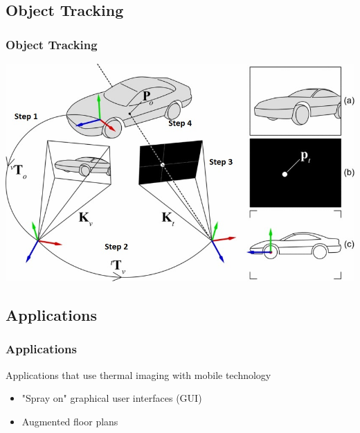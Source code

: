 \documentclass{beamer}
\begin{document}
\subsection{Object Tracking}
\begin{frame}	
\frametitle{Object Tracking}
	\includegraphics[width=\textwidth]{images/Tracking}
\end{frame}



\subsection{Applications}

\begin{frame}
	\frametitle{Applications}
	Applications that use thermal imaging with mobile technology 
	\begin{itemize}
		\item "Spray on" graphical user interfaces (GUI)
		\item Augmented floor plans
	\end{itemize}
\end{frame}
\end{document}
